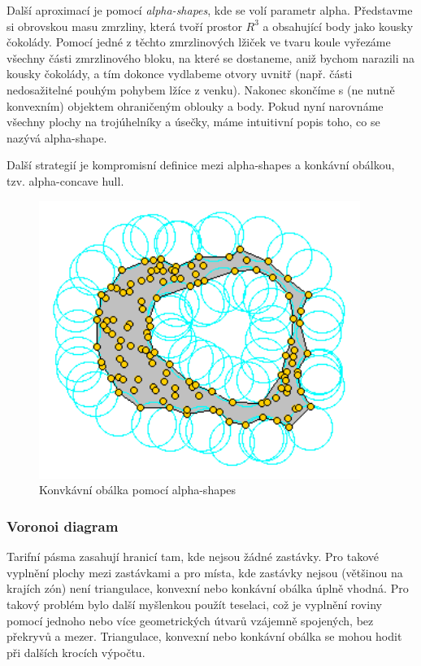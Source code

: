 Další aproximací je pomocí \textit{alpha-shapes}, kde se volí parametr alpha. Představme si obrovskou masu zmrzliny,
která tvoří prostor \(R^3\) a obsahující body jako  kousky čokolády. Pomocí jedné z těchto 
zmrzlinových lžiček ve tvaru koule vyřezáme všechny části zmrzlinového bloku, na které se dostaneme,
aniž bychom narazili na kousky čokolády, a tím dokonce vydlabeme otvory uvnitř 
(např. části nedosažitelné pouhým pohybem lžíce z venku). Nakonec skončíme s 
(ne nutně konvexním) objektem ohraničeným oblouky a body. Pokud nyní narovnáme všechny 
 plochy na trojúhelníky a úsečky, máme intuitivní popis toho, co se nazývá alpha-shape. \cite{alpha-shapes}

Další strategií je kompromisní definice mezi alpha-shapes a konkávní obálkou, tzv. alpha-concave
hull. 

\begin{figure}[H] \centering
    \includegraphics[width=296pt]{./pictures/alphashape.png}
    \caption[Konvkávní obálka pomocí alpha-shapes]{Konvkávní obálka pomocí alpha-shapes \cite{alpha-shapes-picture}}
	\label{fig:alpha-shapes-picture}              
\end{figure} 

\subsubsection{Voronoi diagram}

Tarifní pásma zasahují hranicí tam, kde nejsou žádné zastávky. Pro takové vyplnění plochy
mezi zastávkami a pro místa, kde zastávky nejsou (většinou na krajích zón) není triangulace, konvexní nebo konkávní 
obálka úplně vhodná. Pro takový problém bylo další myšlenkou použít teselaci, což je vyplnění roviny pomocí jednoho
nebo více geometrických útvarů vzájemně spojených, bez překryvů a mezer. Triangulace, konvexní nebo konkávní 
obálka se mohou hodit při dalších krocích výpočtu.

